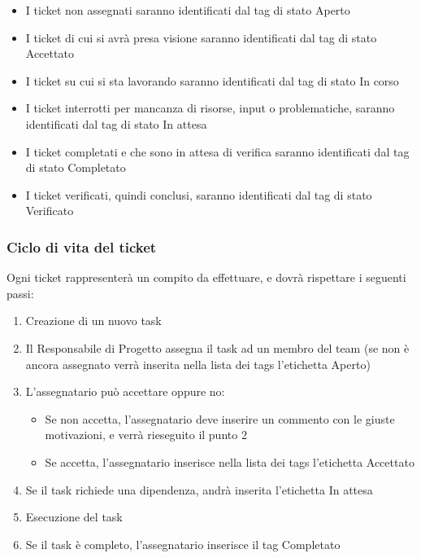 \begin{itemize}
	
	\item I ticket non assegnati saranno identificati dal tag di stato Aperto
	\item I ticket di cui si avrà presa visione saranno identificati dal tag di stato Accettato
	\item I ticket su cui si sta lavorando saranno identificati dal tag di stato In corso
	\item I ticket interrotti per mancanza di risorse, input o problematiche, saranno identificati dal tag di stato In attesa
	\item I ticket completati e che sono in attesa di verifica saranno identificati dal tag di stato Completato
	\item I ticket verificati, quindi conclusi, saranno identificati dal tag di stato Verificato
	
\end{itemize}

\subsubsection{Ciclo di vita del ticket}

Ogni ticket rappresenterà un compito da effettuare, e dovrà rispettare i seguenti passi:
\begin{enumerate}
	\item Creazione di un nuovo task
	\item Il Responsabile di Progetto assegna il task ad un membro del team (se non è ancora assegnato verrà inserita nella lista dei tags l'etichetta Aperto)
	\item L'assegnatario può accettare oppure no:
	\begin{itemize}
		\item Se non accetta, l'assegnatario deve inserire un commento con le giuste motivazioni, e verrà rieseguito il punto 2
		\item Se accetta, l'assegnatario inserisce nella lista dei tags l'etichetta Accettato
	\end{itemize}
	\item Se il task richiede una dipendenza, andrà inserita l'etichetta In attesa
	\item Esecuzione del task
	\item Se il task è completo, l'assegnatario inserisce il tag Completato	
\end{enumerate}

